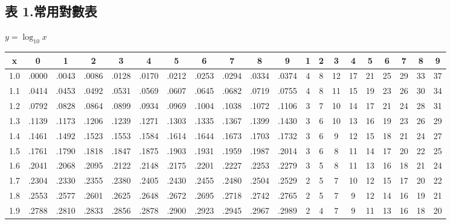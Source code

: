 
\subsection*{表 1.\quad 常用對數表}
\begin{center} $y = \log_{10} x$ \end{center}
{\centering\fontsize{7.5pt}{8.8pt}\selectfont\setlength{\tabcolsep}{1.5pt}\renewcommand{\arraystretch}{0.96}
\begin{tabular}{|c|cccccccccc|ccccccccc|}
\hline
x & 0 & 1 & 2 & 3 & 4 & 5 & 6 & 7 & 8 & 9 & 1 & 2 & 3 & 4 & 5 & 6 & 7 & 8 & 9 \\ \hline
1.0 & .0000 & .0043 & .0086 & .0128 & .0170 & .0212 & .0253 & .0294 & .0334 & .0374 & 4 & 8 & 12 & 17 & 21 & 25 & 29 & 33 & 37 \\
1.1 & .0414 & .0453 & .0492 & .0531 & .0569 & .0607 & .0645 & .0682 & .0719 & .0755 & 4 & 8 & 11 & 15 & 19 & 23 & 26 & 30 & 34 \\
1.2 & .0792 & .0828 & .0864 & .0899 & .0934 & .0969 & .1004 & .1038 & .1072 & .1106 & 3 & 7 & 10 & 14 & 17 & 21 & 24 & 28 & 31 \\
1.3 & .1139 & .1173 & .1206 & .1239 & .1271 & .1303 & .1335 & .1367 & .1399 & .1430 & 3 & 6 & 10 & 13 & 16 & 19 & 23 & 26 & 29 \\
1.4 & .1461 & .1492 & .1523 & .1553 & .1584 & .1614 & .1644 & .1673 & .1703 & .1732 & 3 & 6 & 9 & 12 & 15 & 18 & 21 & 24 & 27 \\
1.5 & .1761 & .1790 & .1818 & .1847 & .1875 & .1903 & .1931 & .1959 & .1987 & .2014 & 3 & 6 & 8 & 11 & 14 & 17 & 20 & 22 & 25 \\
1.6 & .2041 & .2068 & .2095 & .2122 & .2148 & .2175 & .2201 & .2227 & .2253 & .2279 & 3 & 5 & 8 & 11 & 13 & 16 & 18 & 21 & 24 \\
1.7 & .2304 & .2330 & .2355 & .2380 & .2405 & .2430 & .2455 & .2480 & .2504 & .2529 & 2 & 5 & 7 & 10 & 12 & 15 & 17 & 20 & 22 \\
1.8 & .2553 & .2577 & .2601 & .2625 & .2648 & .2672 & .2695 & .2718 & .2742 & .2765 & 2 & 5 & 7 & 9 & 12 & 14 & 16 & 19 & 21 \\
1.9 & .2788 & .2810 & .2833 & .2856 & .2878 & .2900 & .2923 & .2945 & .2967 & .2989 & 2 & 4 & 7 & 9 & 11 & 13 & 16 & 18 & 20 \\

\end{tabular}}
